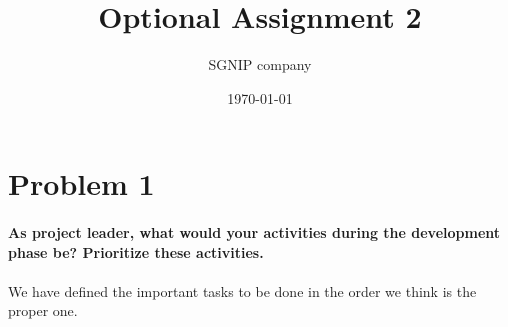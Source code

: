 \documentclass{article}
\title{Optional Assignment 2}
\date{\today}
\author{SGNIP company}
\begin{document}
\maketitle

\newpage

\section{Problem 1}
\paragraph{As project leader, what would your activities during the development phase be?
Prioritize these activities.}
\paragraph{}

We have defined the important tasks to be done in the order we think is the proper one.
\end{document}
